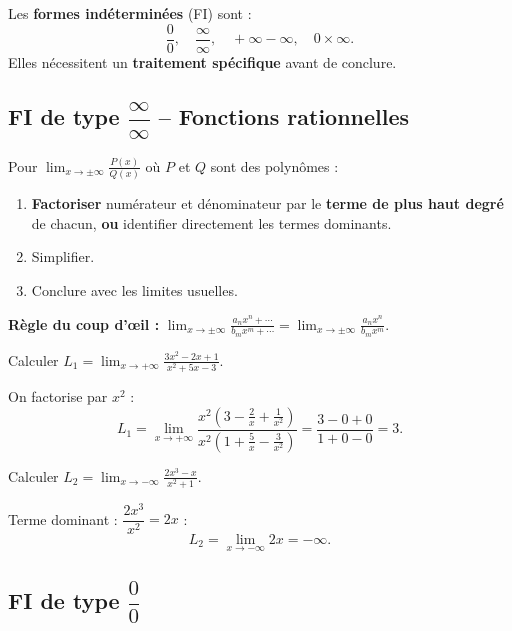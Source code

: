 \begin{attention}
	Les \textbf{formes indéterminées} (FI) sont :
	\[
	\frac{0}{0}, \quad \frac{\infty}{\infty}, \quad
	+\infty - \infty, \quad 0 \times \infty.
	\]
	Elles nécessitent un \textbf{traitement spécifique} avant de conclure.
\end{attention}

\subsection{FI de type \texorpdfstring{$\dfrac{\infty}{\infty}$}{inf/inf} -- Fonctions rationnelles}

\begin{methode}
	Pour $\displaystyle\lim_{x\to\pm\infty}\frac{P(x)}{Q(x)}$
	où $P$ et $Q$ sont des polynômes :
	\begin{enumerate}
		\item \textbf{Factoriser} numérateur et dénominateur par
		le \textbf{terme de plus haut degré} de chacun,
		\textbf{ou} identifier directement les termes dominants.
		\item Simplifier.
		\item Conclure avec les limites usuelles.
	\end{enumerate}
	\textbf{Règle du coup d'œil :}
	$\displaystyle\lim_{x\to\pm\infty}\frac{a_nx^n+\cdots}{b_mx^m+\cdots}
	= \lim_{x\to\pm\infty}\frac{a_nx^n}{b_mx^m}$.
\end{methode}

\begin{exemple}
	Calculer $\displaystyle L_1=\lim_{x\to+\infty}\frac{3x^2-2x+1}{x^2+5x-3}$.
	
	On factorise par $x^2$ :
	\[
	L_1 = \lim_{x\to+\infty}
	\frac{x^2\!\left(3-\frac{2}{x}+\frac{1}{x^2}\right)}
	{x^2\!\left(1+\frac{5}{x}-\frac{3}{x^2}\right)}
	= \frac{3-0+0}{1+0-0} = 3.
	\]
\end{exemple}

\begin{exemple}
	Calculer $\displaystyle L_2=\lim_{x\to-\infty}\frac{2x^3-x}{x^2+1}$.
	
	Terme dominant : $\dfrac{2x^3}{x^2}=2x$ :
	\[
	L_2 = \lim_{x\to-\infty}2x = -\infty.
	\]
\end{exemple}

\subsection{FI de type \texorpdfstring{$\dfrac{0}{0}$}{0/0}}

